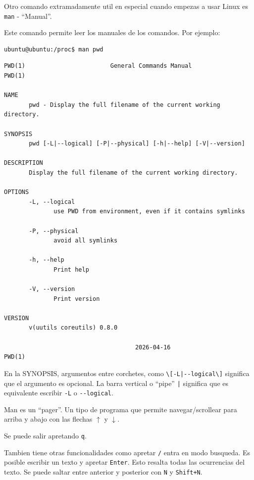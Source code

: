 \documentclass[11pt,a4paper]{article}
\begin{document}
Otro comando extramadamente util en especial cuando empezas a usar Linux es \lstinline!man! - ``Manual''.

Este comando permite leer los manuales de los comandos. Por ejemplo:

\begin{lstlisting}[language=bash]
ubuntu@ubuntu:/proc$ man pwd
\end{lstlisting}

\begin{lstlisting}
PWD(1)                        General Commands Manual                        PWD(1)

NAME
       pwd - Display the full filename of the current working directory.

SYNOPSIS
       pwd [-L|--logical] [-P|--physical] [-h|--help] [-V|--version]

DESCRIPTION
       Display the full filename of the current working directory.

OPTIONS
       -L, --logical
              use PWD from environment, even if it contains symlinks

       -P, --physical
              avoid all symlinks

       -h, --help
              Print help

       -V, --version
              Print version

VERSION
       v(uutils coreutils) 0.8.0

                                     2026-04-16                              PWD(1)
\end{lstlisting}

\begin{infobox}
En la SYNOPSIS, argumentos entre corchetes, como \lstinline!\[-L|--logical\]! significa que el argumento es opcional.
La barra vertical o ``pipe'' \lstinline!|! significa que es equivalente escribir \lstinline!-L! o \lstinline!--logical!.
\end{infobox}

\begin{infobox}
Man es un ``pager''. Un tipo de programa que permite navegar/scrollear para arriba y abajo con las flechas $\uparrow$ y $\downarrow$.

Se puede salir apretando \lstinline!q!.

Tambien tiene otras funcionalidades como apretar \lstinline!/! entra en modo busqueda. Es posible escribir un texto y apretar \lstinline!Enter!. Esto resalta todas las ocurrencias del texto. Se puede saltar entre anterior y posterior con \lstinline!N! y \lstinline!Shift+N!.
\end{infobox}
\end{document}
